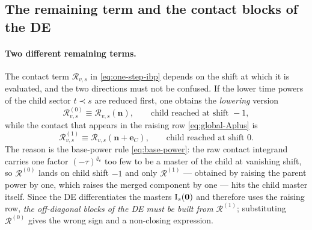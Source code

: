 \documentclass[11pt,a4paper]{article}
\newcommand{\cR}{\mathcal R}
\begin{document}
\subsection{The remaining term and the contact blocks of the DE}
\label{sec:remaining}

\paragraph{Two different remaining terms.}
The contact term $\cR_{v,s}$ in \eqref{eq:one-step-ibp} depends on the shift at which it is
evaluated, and the two directions must not be confused. If the lower time powers of the child sector
$t\prec s$ are reduced first, one obtains the \emph{lowering} version
\begin{equation}
  \cR_{v,s}^{(0)}\equiv\cR_{v,s}(\bm n),
  \qquad
  \text{child reached at shift } -1,
  \label{eq:R0}
\end{equation}
while the contact that appears in the raising row \eqref{eq:global-Aplus} is
\begin{equation}
  \cR_{v,s}^{(1)}\equiv\cR_{v,s}(\bm n+\bm e_C),
  \qquad
  \text{child reached at shift } 0.
  \label{eq:R1}
\end{equation}
The reason is the base-power rule \eqref{eq:base-power}: the raw contact integrand carries one
factor $(-\tau)^{\varrho_e}$ too few to be a master of the child at vanishing shift, so
$\cR^{(0)}$ lands on child shift $-1$ and only $\cR^{(1)}$ --- obtained by raising the parent power
by one, which raises the merged component by one --- hits the child master itself. Since the DE
differentiates the masters $\bm{\text I}_s(\bm 0)$ and therefore uses the raising row, \emph{the
off-diagonal blocks of the DE must be built from $\cR^{(1)}$}; substituting $\cR^{(0)}$ gives the
wrong sign and a non-closing expression.
\end{document}
